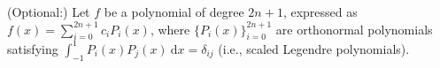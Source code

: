 \documentclass[answers]{exam}
\begin{document}
\begin{questions}
\question%
(Optional:) Let $f$ be a polynomial of degree $2 n+1$, expressed as $f(x)=\sum_{i=0}^{2 n+1} c_{i} P_{i}(x)$, where $\{P_{i}(x)\}_{i=0}^{2 n+1}$ are orthonormal polynomials satisfying $\int_{-1}^{1} P_{i}(x) P_{j}(x)~\mathrm d x=\delta_{i j}$ (i.e., scaled Legendre polynomials).

\end{questions}
\end{document}
